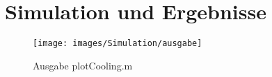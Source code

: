 \chapter{Simulation und Ergebnisse}
\label{chp:sue}

\begin{figure}[h]
	\begin{center}
	\texttt{[image: images/Simulation/ausgabe]}
	\end{center}
\caption{Ausgabe plotCooling.m}
\label{fig:ausgabe}
\end{figure}

